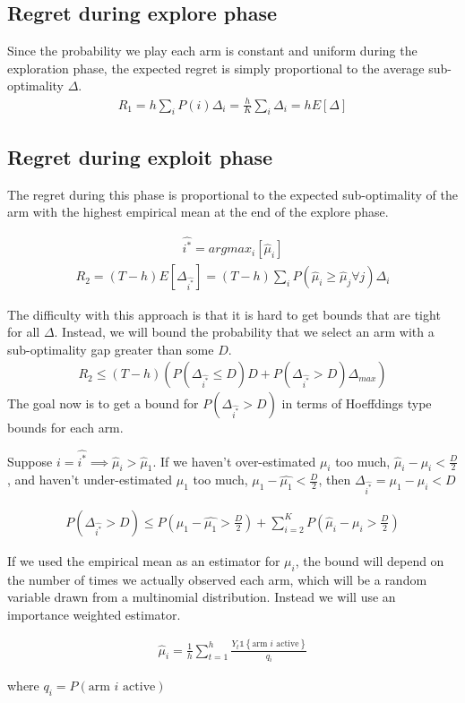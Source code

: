 \documentclass{article}
\newcommand{\set}[1]{\left\{#1\right\}}
\newcommand{\ind}[1]{\mathds{1}\!\!\set{#1}}
\newcommand{\eqn}[1]{\begin{align}#1\end{align}}
\theoremstyle{plain}
\theoremstyle{definition}
\begin{document}
\subsection*{Regret during explore phase}
Since the probability we play each arm is constant and uniform during the exploration phase, the expected regret is simply proportional to the average sub-optimality $\Delta$.
\eqn{
R_1 = h\sum_i P(i)\Delta_i = \frac{h}{K}\sum_i \Delta_i = h E[\Delta]
}

\subsection*{Regret during exploit phase}
The regret during this phase is proportional to the expected sub-optimality of the arm with the highest empirical mean at the end of the explore phase.

\eqn{
\hat{i^*} = argmax_i [\hat{\mu}_i]
}
\eqn{
R_2 = (T-h)E[\Delta_{\hat{i^*}}] = (T-h)\sum_i P(\hat{\mu}_i \geq \hat{\mu}_j \forall j)\Delta_i 
}

The difficulty with this approach is that it is hard to get bounds that are tight for all $\Delta$. Instead, we will bound the probability that we select an arm with a sub-optimality gap greater than some $D$.
\eqn{
R_2 \leq (T-h)\left(P(\Delta_{\hat{i^*}} \leq D) D+P(\Delta_{\hat{i^*}} > D)  \Delta_{max} \right)
}
The goal now is to get a bound for $P(\Delta_{\hat{i^*}} > D)$ in terms of Hoeffdings type bounds for each arm. 

Suppose $i = \hat{i^*} \implies \hat{\mu}_i > \hat{\mu}_1$. If we haven't over-estimated $\mu_i$ too much, $\hat{\mu}_i - \mu_{i} < \frac{D}{2}$, and haven't under-estimated $\mu_1$ too much, $\mu_1 - \hat{\mu_1} < \frac{D}{2}$, then $\Delta_{\hat{i^*}} = \mu_1 - \mu_i < D$

\eqn{
\label{eqn:probDeltaToLarge}
P(\Delta_{\hat{i^*}} > D) \leq  P(\mu_1 - \hat{\mu_1} > \frac{D}{2})+ \sum_{i=2}^K P(\hat{\mu}_i - \mu_{i} > \frac{D}{2})
}

If we used the empirical mean as an estimator for $\mu_i$, the bound will depend on the number of times we actually observed each arm, which will be a random variable drawn from a multinomial distribution. Instead we will use an importance weighted estimator.

\eqn{
\label{eqn:importance_weighted_estimator}
\hat{\mu}_i = \frac{1}{h}\sum_{t=1}^h \frac{Y_t\ind{\text{arm $i$ active}}}{q_i}
}

where $q_i = P(\text{arm $i$ active})$
\end{document}
